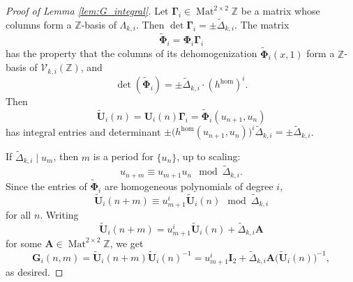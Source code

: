 \documentclass{article}
\numberwithin{equation}{section}
\theoremstyle{definition}
\theoremstyle{remark}
\DeclareMathOperator{\Mat}{Mat}
\newcommand{\ZZ}{\mathbb{Z}}
\newcommand{\V}{\mathcal{V}}
\newcommand{\<}{\left\langle}
\renewcommand{\>}{\right\rangle}
\begin{document}
\begin{proof}[Proof of Lemma \ref{lem:G_integral}]
  Let $\boldsymbol{\Gamma}_i \in \Mat^{2\times 2} \ZZ$ be a matrix whose columns form a $\ZZ$-basis of $\Lambda_{k,i}$. Then $\det \boldsymbol{\Gamma}_i = \pm \widetilde\Delta_{k,i}$. The matrix
  \begin{equation*}
    \widetilde{\boldsymbol{\Phi}}_i = \boldsymbol{\Phi}_i \boldsymbol{\Gamma}_i
  \end{equation*}
  has the property that the columns of its dehomogenization $\widetilde{\boldsymbol{\Phi}}_i(x,1)$ form a $\ZZ$-basis of $\V_{k,i}(\ZZ)$, and
  \begin{equation*}
    \det(\widetilde{\boldsymbol{\Phi}}_i) = \pm \widetilde\Delta_{k,i} \cdot (h^{\hom})^i.
  \end{equation*}
  Then
  \begin{equation*}
    \widetilde{\mathbf{U}}_i(n) = \mathbf{U}_i(n) \boldsymbol{\Gamma}_i = \widetilde{\boldsymbol{\Phi}}_i(u_{n+1}, u_n)
  \end{equation*}
  has integral entries and determinant $\pm \bigl(h^{\hom}(u_{n+1}, u_n)\bigr)^i \widetilde\Delta_{k,i} = \pm \widetilde\Delta_{k,i}$.

  If $\widetilde\Delta_{k,i} \mid u_m$, then $m$ is a period for $\{u_n\}$, up to scaling:
  \begin{equation*}
    u_{n+m} \equiv u_{m+1}u_n \mod \widetilde\Delta_{k,i}.
  \end{equation*}
  Since the entries of $\widetilde{\boldsymbol{\Phi}}_i$ are homogeneous polynomials of degree $i$,
  \begin{equation*}
    \widetilde{\mathbf{U}}_i(n + m) \equiv u_{m+1}^i \widetilde{\mathbf{U}}_i(n) \mod \widetilde\Delta_{k,i}
  \end{equation*}
  for all $n$. Writing
  \begin{equation*}
    \widetilde{\mathbf{U}}_i(n + m) = u_{m+1}^i \widetilde{\mathbf{U}}_i(n) + \widetilde\Delta_{k,i} \mathbf{A}
  \end{equation*}
  for some $\mathbf{A} \in \Mat^{2\times 2} \ZZ$, we get
  \begin{equation*}
    \mathbf{G}_i(n,m) = \widetilde{\mathbf{U}}_i(n + m) \widetilde{\mathbf{U}}_i(n)^{-1} = u_{m+1}^i \mathbf{I}_2 + \widetilde\Delta_{k,i} \mathbf{A} \big(\widetilde{\mathbf{U}}_i(n)\big)^{-1},
  \end{equation*}
  as desired.
\end{proof}
\end{document}

